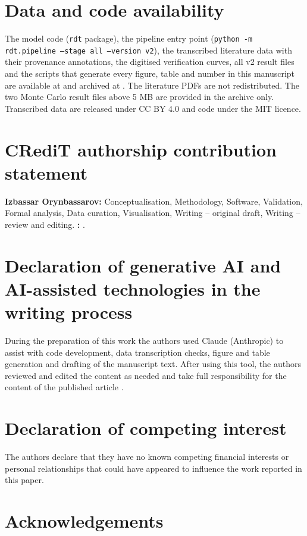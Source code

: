 \section*{Data and code availability}

The model code (\texttt{rdt} package), the pipeline entry point (\texttt{python -m rdt.pipeline --stage all --version v2}), the
transcribed literature data with their provenance annotations, the digitised verification curves, all v2 result files and the
scripts that generate every figure, table and number in this manuscript are available at  and archived at
. The literature PDFs are not redistributed. The two Monte Carlo result files above 5 MB are provided in the
archive only. Transcribed data are released under CC BY 4.0 and code under the MIT licence.

\section*{CRediT authorship contribution statement}

\textbf{Izbassar Orynbassarov:} Conceptualisation, Methodology, Software, Validation, Formal analysis, Data curation, Visualisation,
Writing -- original draft, Writing -- review and editing. \textbf{:} .

\section*{Declaration of generative AI and AI-assisted technologies in the writing process}

During the preparation of this work the authors used Claude (Anthropic) to assist with code development, data transcription
checks, figure and table generation and drafting of the manuscript text. After using this tool, the authors reviewed and edited the
content as needed and take full responsibility for the content of the published article .

\section*{Declaration of competing interest}

The authors declare that they have no known competing financial interests or personal relationships that could have appeared to
influence the work reported in this paper.

\section*{Acknowledgements}

